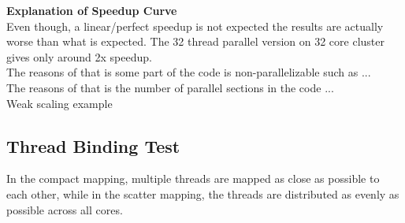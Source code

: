 \documentclass{article}
\newcommand\tab[1][0.5cm]{\hspace*{#1}}
\begin{document}
\textbf{Explanation of Speedup Curve}
\\
\tab Even though, a linear/perfect speedup is not expected the results are actually worse than what is expected.
The 32 thread parallel version on 32 core cluster gives only around 2x speedup.\\
The reasons of that is some part of the code is non-parallelizable such as ...\\
The reasons of that is the number of parallel sections in the code ...
\\ Weak scaling example
\newpage

\subsection{Thread Binding Test}
\tab In the compact mapping, multiple threads are mapped as close as possible to each other, 
while in the scatter mapping, the threads are distributed as evenly as possible across all cores. 
\end{document}
